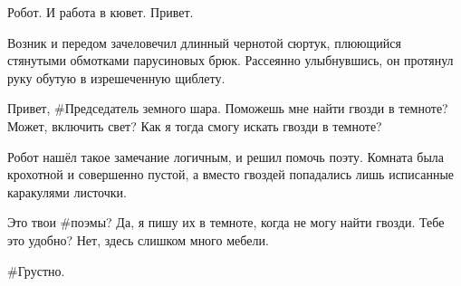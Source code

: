 {\small \begin{dialog}
\X Робот. И работа в кювет. Привет.
\end{dialog}

\begin{monolog}
Возник и передом зачеловечил длинный чернотой сюртук, плюющийся стянутыми обмотками парусиновых брюк. Рассеянно улыбнувшись, он протянул руку обутую в изрешеченную щиблету.
\end{monolog}

\begin{dialog}
\R Привет, \#Председатель земного шара.
\X Поможешь мне найти гвозди в темноте?
\R Может, включить свет?
\X Как я тогда смогу искать гвозди в темноте?
\end{dialog}

\begin{monolog}
Робот нашёл такое замечание логичным, и решил помочь поэту. Комната была крохотной и совершенно пустой, а вместо гвоздей попадались лишь исписанные каракулями листочки.
\end{monolog}

\begin{dialog}
\R Это твои \#поэмы?
\X Да, я пишу их в темноте, когда не могу найти гвозди.
\R Тебе это удобно?
\X Нет, здесь слишком много мебели.
\end{dialog}

\begin{dialog}
\R \#Грустно.
\end{dialog}}